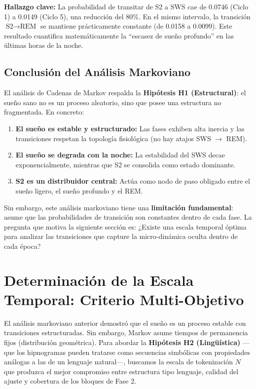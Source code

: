 \textbf{Hallazgo clave:} La probabilidad de transitar de S2 a SWS cae de 0.0746 (Ciclo 1) a 0.0149 (Ciclo 5), una reducción del 80\%. En el mismo intervalo, la transición $\text{S2} \rightarrow \text{REM}$ se mantiene prácticamente constante (de 0.0158 a 0.0099). Este resultado cuantifica matemáticamente la ``escasez de sueño profundo'' en las últimas horas de la noche.

\subsection{Conclusión del Análisis Markoviano}

El análisis de Cadenas de Markov respalda la \textbf{Hipótesis H1 (Estructural)}: el sueño sano no es un proceso aleatorio, sino que posee una estructura no fragmentada. En concreto:
\begin{enumerate}
    \item \textbf{El sueño es estable y estructurado:} Las fases exhiben alta inercia y las transiciones respetan la topología fisiológica (no hay atajos SWS $\rightarrow$ REM).
    \item \textbf{El sueño se degrada con la noche:} La estabilidad del SWS decae exponencialmente, mientras que S2 se consolida como estado dominante.
    \item \textbf{S2 es un distribuidor central:} Actúa como nodo de paso obligado entre el sueño ligero, el sueño profundo y el REM.
\end{enumerate}

Sin embargo, este análisis markoviano tiene una \textbf{limitación fundamental}: asume que las probabilidades de transición son constantes dentro de cada fase. La pregunta que motiva la siguiente sección es: ¿Existe una escala temporal óptima para analizar las transiciones que capture la micro-dinámica oculta dentro de cada época?

\section{Determinación de la Escala Temporal: Criterio Multi-Objetivo}

El análisis markoviano anterior demostró que el sueño es un proceso estable con transiciones estructuradas. Sin embargo, Markov asume tiempos de permanencia fijos (distribución geométrica). Para abordar la \textbf{Hipótesis H2 (Lingüística)} ---que los hipnogramas pueden tratarse como secuencias simbólicas con propiedades análogas a las de un lenguaje natural---, buscamos la escala de tokenización $N$ que produzca el mejor compromiso entre estructura tipo lenguaje, calidad del ajuste y cobertura de los bloques de Fase 2.

